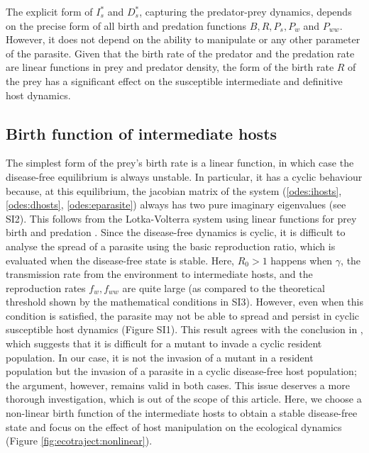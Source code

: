 \documentclass[a4paper]{scrartcl}
\begin{document}
The explicit form of $I_s^*$ and $D_s^*$, capturing the predator-prey dynamics, depends on the precise form of all birth and predation functions $B, R, P_s, P_w$ and $P_{ww}$.
However, it does not depend on the ability to manipulate or any other parameter of the parasite. 
Given that the birth rate of the predator and the predation rate are linear functions in prey and predator density, the form of the birth rate $R$ of the prey has a significant effect on the susceptible intermediate and definitive host dynamics.

\subsection*{Birth function of intermediate hosts}

The simplest form of the prey's birth rate is a linear function, in which case the disease-free equilibrium is always unstable. In particular, it has a cyclic behaviour because, at this equilibrium, the jacobian matrix of the system (\ref{odes:ihosts}, \ref{odes:dhosts}, \ref{odes:eparasite}) always has two pure imaginary eigenvalues (see SI2). 
This follows from the Lotka-Volterra system using linear functions for prey birth and predation \citep{Lotka1920}.
Since the disease-free dynamics is cyclic, it is difficult to analyse the spread of a parasite using the basic reproduction ratio, which is evaluated when the disease-free state is stable. 
Here,  $R_0 > 1$  happens when $\gamma$, the transmission rate from the environment to intermediate hosts, and the reproduction rates $f_w, f_{ww}$ are quite large (as compared to the theoretical threshold shown by the mathematical conditions in SI3). 
However, even when this condition is satisfied, the parasite may not be able to spread and persist in cyclic susceptible host dynamics (Figure SI1). 
This result agrees with the conclusion in \citep{Ripa:Evol:2013}, which suggests that it is difficult for a mutant to invade a cyclic resident population. 
In our case, it is not the invasion of a mutant in a resident population but the invasion of a parasite in a cyclic disease-free host population; the argument, however, remains valid in both cases. 
This issue deserves a more thorough investigation, which is out of the scope of this article. 
Here, we choose a non-linear birth function of the intermediate hosts to obtain a stable disease-free state and focus on the effect of host manipulation on the ecological dynamics (Figure \ref{fig:ecotraject:nonlinear}). 
\end{document}
